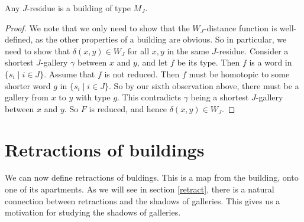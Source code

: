 \documentclass[11pt]{article}
\begin{document}
\begin{theorem}
    Any $J$-residue is a building of type $M_J$. 
\end{theorem}

\begin{proof}
    We note that we only need to show that the $W_J$-distance function is well-defined, as the other properties of a building are obvious. So in particular, we need to show that $\delta(x,y)\in W_J$ for all $x,y$ in the same $J$-residue. Consider a shortest $J$-gallery $\gamma$ between $x$ and $y$, and let $f$ be its type. Then $f$ is a word in $\{s_i\mid i\in J\}$. Assume that $f$ is not reduced. Then $f$ must be homotopic to some shorter word $g$ in $\{s_i\mid i\in J\}$. So by our sixth observation above, there must be a gallery from $x$ to $y$ with type $g$. This contradicts $\gamma$ being a shortest $J$-gallery between $x$ and $y$. So $F$ is reduced, and hence $\delta(x,y)\in W_J$. 
\end{proof}







\section{Retractions of buildings}\label{5}


We can now define retractions of buldings. This is a map from the building, onto one of its apartments. As we will see in section \ref{retract}, there is a natural connection between retractions and the shadows of galleries. This gives us a motivation for studying the shadows of galleries. 
\end{document}
